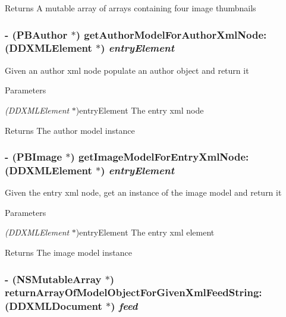 \begin{DoxyReturn}{Returns}
A mutable array of arrays containing four image thumbnails 
\end{DoxyReturn}
\hypertarget{interface_p_b_data_provider_ab4f175fcbd505518c33cd0b2b6686a98}{
\subsubsection[{getAuthorModelForAuthorXmlNode:}]{\setlength{\rightskip}{0pt plus 5cm}-\/ ({\bf PBAuthor} $\ast$) getAuthorModelForAuthorXmlNode: ({\bf DDXMLElement} $\ast$) {\em entryElement}}}
\label{interface_p_b_data_provider_ab4f175fcbd505518c33cd0b2b6686a98}
Given an author xml node populate an author object and return it 
\begin{DoxyParams}{Parameters}
\item[{\em (DDXMLElement}]$\ast$)entryElement The entry xml node \end{DoxyParams}
\begin{DoxyReturn}{Returns}
The author model instance 
\end{DoxyReturn}
\hypertarget{interface_p_b_data_provider_a550f8f74323fc7a204620dfff3bc8183}{
\subsubsection[{getImageModelForEntryXmlNode:}]{\setlength{\rightskip}{0pt plus 5cm}-\/ ({\bf PBImage} $\ast$) getImageModelForEntryXmlNode: ({\bf DDXMLElement} $\ast$) {\em entryElement}}}
\label{interface_p_b_data_provider_a550f8f74323fc7a204620dfff3bc8183}
Given the entry xml node, get an instance of the image model and return it 
\begin{DoxyParams}{Parameters}
\item[{\em (DDXMLElement}]$\ast$)entryElement The entry xml element \end{DoxyParams}
\begin{DoxyReturn}{Returns}
The image model instance 
\end{DoxyReturn}
\hypertarget{interface_p_b_data_provider_aa087e818d083884b3244df839cfcf2b2}{
\subsubsection[{returnArrayOfModelObjectForGivenXmlFeedString:}]{\setlength{\rightskip}{0pt plus 5cm}-\/ (NSMutableArray $\ast$) returnArrayOfModelObjectForGivenXmlFeedString: ({\bf DDXMLDocument} $\ast$) {\em feed}}}
